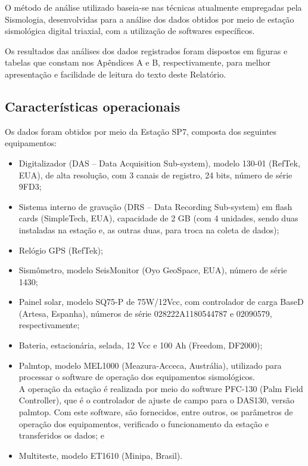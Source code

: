 \par{O método de análise utilizado baseia-se nas técnicas atualmente empregadas pela Sismologia, desenvolvidas para a análise dos dados obtidos por meio de estação sismológica digital triaxial, com a utilização de softwares específicos.}

\par{Os resultados das análises dos dados registrados foram dispostos em figuras e tabelas que constam nos Apêndices A e B, respectivamente, para melhor apresentação e facilidade de leitura do texto deste Relatório.}

\subsection{Características operacionais}
\label{subsec:caracteristicas}
\par{Os dados foram obtidos por meio da Estação SP7, composta dos seguintes equipamentos:}
\begin{itemize}
    \item Digitalizador (DAS – Data Acquisition Sub-system), modelo 130-01 (RefTek, EUA), de alta resolução, com 3 canais de registro, 24 bits, número de série 9FD3;
    \item Sistema interno de gravação (DRS – Data Recording Sub-system) em flash cards (SimpleTech, EUA), capacidade de 2 GB (com 4 unidades, sendo duas instaladas na estação e, as outras duas, para troca na coleta de dados);
    \item Relógio GPS (RefTek);
    \item Sismômetro, modelo SeisMonitor (Oyo GeoSpace, EUA), número de série 1430;
    \item Painel solar, modelo SQ75-P de 75W/12Vcc, com controlador de carga BaseD (Artesa, Espanha), números de série 028222A1180544787 e 02090579, respectivamente;
    \item Bateria, estacionária, selada, 12 Vcc e 100 Ah (Freedom, DF2000);
    \item Palmtop, modelo MEL1000 (Meazura-Acceca, Austrália), utilizado para processar o software de operação dos equipamentos sismológicos. \\
A operação da estação é realizada por meio do software PFC-130 (Palm Field Controller), que é o controlador de ajuste de campo para o DAS130, versão palmtop. Com este software, são fornecidos, entre outros, os parâmetros de operação dos equipamentos, verificado o funcionamento da estação e transferidos os dados; e
    \item Multiteste, modelo ET1610 (Minipa, Brasil).
\end{itemize}

